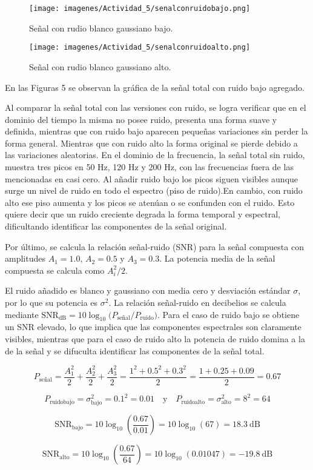 \bigskip
      \begin{figure}[H]
            \centering
            \texttt{[image: imagenes/Actividad\_5/senalconruidobajo.png]}
            \caption{Señal con rudio blanco gaussiano bajo.}
      \end{figure}
\bigskip

\bigskip
      \begin{figure}[H]
            \centering
            \texttt{[image: imagenes/Actividad\_5/senalconruidoalto.png]}
            \caption{Señal con rudio blanco gaussiano alto.}
      \end{figure}
\bigskip


En las Figuras 5 se observan la gráfica de la señal total con ruido bajo agregado.
\bigskip

Al comparar la señal total con las versiones con ruido, se logra verificar que en el dominio del tiempo la misma no posee ruido, 
presenta una forma suave y definida, mientras que con ruido bajo aparecen pequeñas variaciones sin perder la forma general. Mientras
que con ruido alto la forma original se pierde debido a las variaciones aleatorias. En el dominio de la frecuencia, la señal total sin 
ruido, muestra tres picos en 50 Hz, 120 Hz y 200 Hz, con las frecuencias fuera de las mencionadas en casi cero. Al añadir ruido bajo 
los picos siguen visibles aunque surge un nivel de ruido en todo el espectro (piso de ruido).En cambio, con ruido alto ese piso 
aumenta y los picos se atenúan o se confunden con el ruido. Esto quiere decir que un ruido creciente degrada la forma temporal y 
espectral, dificultando identificar las componentes de la señal original.\par

\bigskip

Por último, se calcula la relación señal-ruido (SNR) para la señal compuesta con amplitudes $A_1=1.0$, $A_2=0.5$ y $A_3=0.3$. 
La potencia media de la señal compuesta se calcula como $A_i^2/2$.

El ruido añadido es blanco y gaussiano con media cero y desviación estándar $\sigma$, por lo que su potencia es $\sigma^2$. 
La relación señal-ruido en decibelios se calcula mediante 
$\text{SNR}_{\mathrm{dB}}=10\log_{10}\!\bigl(P_{\text{señal}}/P_{\text{ruido}}\bigr)$. 
Para el caso de ruido bajo se obtiene un SNR elevado, lo que implica que las componentes espectrales son claramente visibles, 
mientras que para el caso de ruido alto la potencia de ruido domina a la de la señal y se difuculta identificar las componentes de 
la señal total.
\bigskip

\noindent \[
      P_{\text{señal}} = 
      \frac{A_1^2}{2}+\frac{A_2^2}{2}+\frac{A_3^2}{2}=
      \frac{1^2+0.5^2+0.3^2}{2}=
      \frac{1+0.25+0.09}{2}=0.67
\]

\noindent \[
      P_{\text{ruidobajo}}=\sigma_{\text{bajo}}^2=0.1^2=0.01
      \quad\text{y}\quad
      P_{\text{ruidoalto}}=\sigma_{\text{alto}}^2=8^2=64
\]

\noindent \[
      \text{SNR}_{\text{bajo}}=
      10\log_{10}\!\left(\frac{0.67}{0.01}\right)=10\log_{10}(67)=18.3~\text{dB}
\]

\noindent \[
      \text{SNR}_{\text{alto}}=
      10\log_{10}\!\left(\frac{0.67}{64}\right)=10\log_{10}(0.01047)=-19.8~\text{dB}
\]
